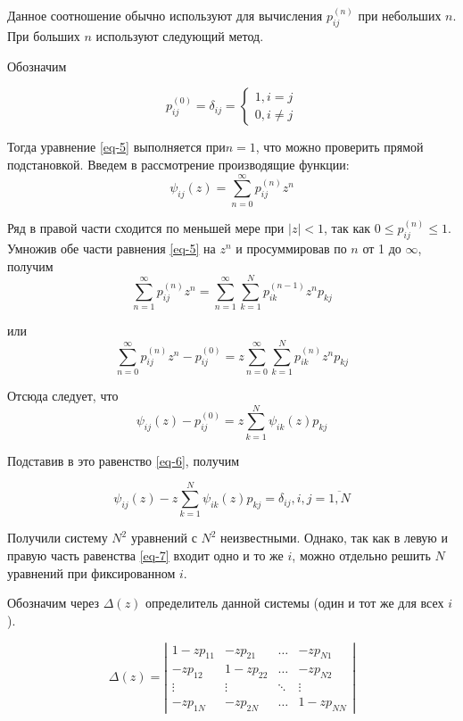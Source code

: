 Данное соотношение обычно используют для вычисления $p_{ij}^{(n)}$ при небольших $n$. При больших $n$ используют следующий метод.
\par\medskip

Обозначим

\begin{equation}\label{eq-6}
    p_{ij}^{(0)} = \delta_{ij} = 
    \begin{cases}
      1, i = j
      \\
      0, i \neq j
    \end{cases}
\end{equation}

Тогда уравнение \eqref{eq-5} выполняется $при n = 1$, что можно проверить прямой подстановкой. Введем в рассмотрение производящие функции:
$$\psi_{ij}(z) = \sum_{n = 0}^{\infty} p_{ij}^{(n)}z^{n} $$

Ряд в правой части сходится по меньшей мере при $|z| < 1$, так как $0 \leq p_{ij}^{(n)} \leq 1$. Умножив обе части равнения \eqref{eq-5} на $z^{n}$ и просуммировав по $n$ от 1 до $\infty$, получим
$$\sum_{n = 1}^{\infty}p_{ij}^{(n)}z^n = \sum_{n = 1}^{\infty} \sum_{k = 1}^{N} p_{ik}^{(n - 1)}z^n p_{kj}$$

или
$$\sum_{n = 0}^{\infty}p_{ij}^{(n)}z^n -  p_{ij}^{(0)} = z \sum_{n = 0}^{\infty} \sum_{k = 1}^{N} p_{ik}^{(n)}z^n p_{kj}$$

Отсюда следует, что
$$\psi_{ij}(z) - p_{ij}^{(0)} = z \sum_{k = 1}^{N} \psi_{ik}(z) p_{kj}$$

Подставив в это равенство \eqref{eq-6}, получим

\begin{equation}\label{eq-7}
	\psi_{ij}(z) - z \sum_{k = 1}^{N} \psi_{ik}(z) p_{kj} = \delta_{ij}, i,j = \overline{1, N}
\end{equation}

Получили систему $N^2$ уравнений с $N^2$ неизвестными. Однако, так как в левую и правую часть равенства \eqref{eq-7} входит одно и то же $i$, можно отдельно решить $N$ уравнений при фиксированном $i$.
\par\medskip

Обозначим через $\Delta(z)$ определитель данной системы (один и тот же для всех $i$).

\begin{equation}\label{eq-8}
	\Delta(z) = \left|
	\begin{array}{cccc}
	1 - zp_{11} & -zp_{21} & \ldots & -zp_{N1}\\
	-zp_{12} & 1 - zp_{22} & \ldots & -zp_{N2}\\
	\vdots & \vdots & \ddots & \vdots\\
	-zp_{1N} & -zp_{2N} & \ldots & 1 - zp_{NN}
	\end{array}
	\right|
\end{equation}

